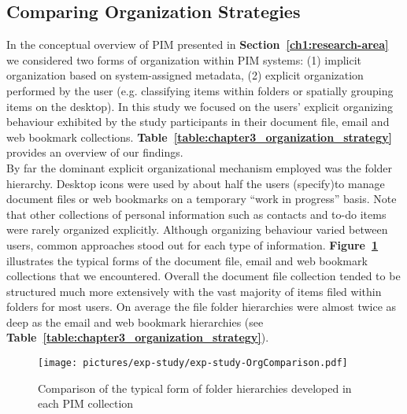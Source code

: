 \newpage
\subsection{Comparing Organization Strategies}
\label{exp-study:qual_organization}

In the conceptual overview of PIM presented in \textbf{Section~\ref{ch1:research-area}} we considered two forms of organization within PIM systems: (1) implicit organization based on system-assigned metadata, (2) explicit organization performed by the user (e.g. classifying items within folders or spatially grouping items on the desktop). 
In this study we focused on the users' explicit organizing behaviour exhibited by the study participants in their document file, email and web bookmark collections.
\textbf{Table~\ref{table:chapter3_organization_strategy}} provides an overview of our findings.
\\

\noindent
By far the dominant explicit organizational mechanism employed was the folder hierarchy. Desktop icons were used by about half the users (specify)to manage document files or web bookmarks on a temporary ``work in progress'' basis. 
Note that other collections of personal information such as contacts and to-do items were rarely organized explicitly.
Although organizing behaviour varied between users, common approaches stood out for each type of information. \textbf{Figure~\ref{fig:chapter1_collection_forms}} illustrates the typical forms of the document file, email and web bookmark collections that we encountered. 
Overall the document file collection tended to be structured much more extensively with the vast majority of items filed within folders for most users.
On average the file folder hierarchies were almost twice as deep as the email and web bookmark hierarchies (see \textbf{Table~\ref{table:chapter3_organization_strategy}}). 

\begin{figure}%
	\begin{center}
		\leavevmode
		\texttt{[image: pictures/exp-study/exp-study-OrgComparison.pdf]}
		\caption{Comparison of the typical form of folder hierarchies developed in each PIM collection}
		\label{fig:chapter1_collection_forms}
	\end{center}
\end{figure}


